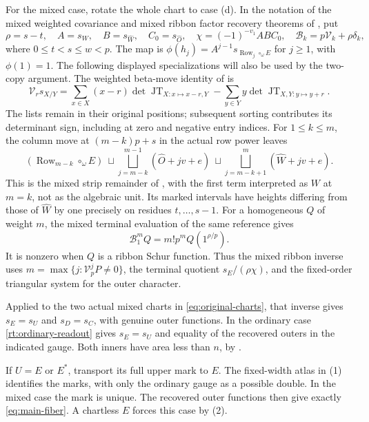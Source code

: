 \documentclass[11pt,a4paper]{amsart}
\numberwithin{equation}{section}
\theoremstyle{plain}
\theoremstyle{definition}
\newcommand{\Row}{\operatorname{Row}}
\newcommand{\JT}{\operatorname{JT}}
\newcommand{\Vop}{\mathcal V}
\begin{document}
For the mixed case, rotate the whole chart to case (d).  In the notation of the mixed weighted covariance and mixed ribbon factor recovery theorems of \cite{Shields2026Readout}, put
\[
 \rho=s-t,\quad A=s_W,\quad B=s_{\widehat W},\quad
 C_0=s_{\widehat O},\quad \chi=(-1)^{-v_1}ABC_0,\quad
 \mathcal B_k=p\Vop_k+\rho\delta_k,
\]
where \(0\le t<s\le w<p\).  The map is
\(\phi(h_j)=A^{j-1}s_{\Row_j\circ_\omega E}\) for \(j\ge1\), with \(\phi(1)=1\).
The following displayed specializations will also be used by the two-copy argument.  The weighted beta-move identity of \cite{Shields2026Readout} is
\begin{equation}\label{rt:weighted-moves}
 \Vop_r s_{X/Y}=
 \sum_{x\in X}(x-r)\det\JT_{X:x\mapsto x-r,Y}
 -\sum_{y\in Y}y\det\JT_{X,Y:y\mapsto y+r}.
\end{equation}
The lists remain in their original positions; subsequent sorting contributes its determinant sign, including at zero and negative entry indices.  For \(1\le k\le m\), the column move at \((m-k)p+s\) in the actual row power leaves
\begin{equation}\label{rt:strip-remainder}
 (\Row_{m-k}\circ_\omega E)\ \sqcup\!
 \bigsqcup_{j=m-k}^{m-1}(\widehat O+jv+e)
 \ \sqcup\!
 \bigsqcup_{j=m-k+1}^{m}(\widehat W+jv+e).
\end{equation}
This is the mixed strip remainder of \cite{Shields2026Readout}, with the first term interpreted as \(W\) at \(m=k\), not as the algebraic unit.  Its marked intervals have heights differing from those of \(\widehat W\) by one precisely on residues \(t,\ldots,s-1\).
For a homogeneous \(Q\) of weight \(m\), the mixed terminal evaluation of the same reference gives
\begin{equation}\label{rt:weighted-top}
 \mathcal B_1^mQ=m!p^m Q(1^{\rho/p}).
\end{equation}
It is nonzero when \(Q\) is a ribbon Schur function.  Thus the mixed ribbon inverse uses \(m=\max\{j:\Vop_p^jP\ne0\}\), the terminal quotient \(s_E/(\rho\chi)\), and the fixed-order triangular system for the outer character.

Applied to the two actual mixed charts in \eqref{eq:original-charts}, that inverse gives \(s_E=s_U\) and \(s_D=s_C\), with genuine outer functions.  In the ordinary case \eqref{rt:ordinary-readout} gives \(s_E=s_U\) and equality of the recovered outers in the indicated gauge.  Both inners have area less than \(n\), by .

If \(U=E\) or \(E^*\), transport its full upper mark to \(E\).  The fixed-width atlas in (1) identifies the marks, with only the ordinary gauge as a possible double.  In the mixed case the mark is unique.  The recovered outer functions then give exactly \eqref{eq:main-fiber}.  A chartless \(E\) forces this case by (2).
\end{document}
